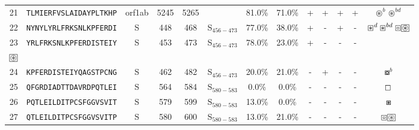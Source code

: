 \begin{tabular}{rcccccccccccc}
21 &  \texttt{TLMIERFVSLAIDAYPLTKHP} &  orf1ab &   5245 &  5265 &                &                          81.0\% &                           71.0\% &          + &           + &          + &           + &                                                                                            $ \circledast^b \circledast^{bd} $ \\
22 &  \texttt{NYNYLYRLFRKSNLKPFERDI} &       S &    448 &   468 &  S$_{456-473}$ &                          77.0\% &                           38.0\% &          + &           - &          + &           - &                                         $ \boxast^d \boxast^{bd} \boxcircle \setlength{\fboxsep}{0.5pt} \boxed{\circledast} $ \\
23 &  \texttt{YRLFRKSNLKPFERDISTEIY} &       S &    453 &   473 &  S$_{456-473}$ &                          78.0\% &                           23.0\% &          + &           - &          - &           - &               \Centerstack{  $\boxempty \boxast \boxast^b \boxcircle$ \\  $\setlength{\fboxsep}{0.5pt} \boxed{\circledast}$ } \\
24 &  \texttt{KPFERDISTEIYQAGSTPCNG} &       S &    462 &   482 &  S$_{456-473}$ &                          20.0\% &                           21.0\% &          - &           + &          - &           - &                                                                                                              $ \boxcircle^b $ \\
25 &  \texttt{QFGRDIADTTDAVRDPQTLEI} &       S &    564 &   584 &  S$_{580-583}$ &                           0.0\% &                            0.0\% &          - &           - &          - &           - &                                                                                                                 $ \boxempty $ \\
26 &  \texttt{PQTLEILDITPCSFGGVSVIT} &       S &    579 &   599 &  S$_{580-583}$ &                          13.0\% &                            0.0\% &          - &           - &          - &           - &                                                                                                                   $ \boxast $ \\
27 &  \texttt{QTLEILDITPCSFGGVSVITP} &       S &    580 &   600 &  S$_{580-583}$ &                          13.0\% &                           21.0\% &          - &           - &          - &           - &                                                                $ \boxcircle \setlength{\fboxsep}{0.5pt} \boxed{\circledast} $ \\

\end{tabular}
